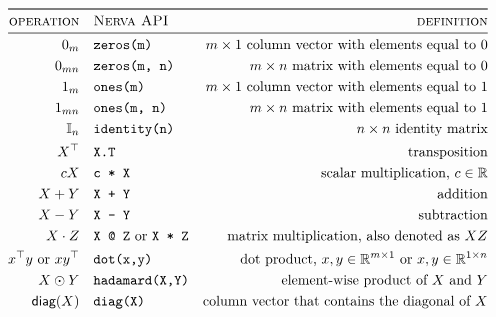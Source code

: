 \documentclass[twoside,11pt]{article}
\newcommand{\func}[1]{\ensuremath{\textsf{#1}}} %
\newcommand{\Reals}{\mathbb{R}}
\begin{document}
\begin{table}[thbp]
\centering
\caption{An overview of matrix operations that are needed for the implementation of the class of MLPs described in this paper. We assume that $X,Y \in \Reals^{m \times n}$ and $Z \in \Reals^{n \times k}$, where $k, m, n \in \mathbb{N}^{+}$. Wherever possible, we use $m$
to denote the number of rows and $n$ to denote the number of columns of a matrix or vector.
The function $\sigma$ is the sigmoid function as defined in Appendix \ref{appendix:activation-functions}.
In the second column we use the unified Nerva API notation, which is implemented consistently across the Python and C++ backends, ensuring a one-to-one correspondence between equations and code.}
\label{table:matrix-operations}
{
\small
\begin{align*}
\toprule
    \textsc{operation} &\quad \textsc{Nerva API} & \textsc{definition}
    \\
    \midrule
    0_{m} &\quad \texttt{zeros(m)} & \text{$m \times 1$ column vector with elements equal to 0}
    \\
    0_{mn} &\quad \texttt{zeros(m, n)} & \text{$m \times n$ matrix with elements equal to 0}
    \\
    1_{m} &\quad \texttt{ones(m)} & \text{$m \times 1$ column vector with elements equal to 1}
    \\
    1_{mn} &\quad \texttt{ones(m, n)} & \text{$m \times n$ matrix with elements equal to 1} 
    \\
    \mathbb{I}_n &\quad \texttt{identity(n)} & \text{$n \times n$ identity matrix} 
    \\
    X^\top &\quad \texttt{X.T} & \text{transposition}
    \\
    cX &\quad \texttt{c * X} & \text{scalar multiplication, $c \in \Reals$}
    \\
    X + Y &\quad \texttt{X + Y} & \text{addition}
    \\
    X - Y &\quad \texttt{X - Y} & \text{subtraction}
    \\
    X \cdot Z &\quad \texttt{X @ Z} \text{ or } \texttt{X * Z} 
    & \text{matrix multiplication, also denoted as $XZ$}
    \\
    x^\top y \text{ or } x y^\top &\quad \texttt{dot(x,y)} & \text{dot product, } x,y \in \Reals^{m \times 1} \text{ or } x,y \in \Reals^{1 \times n}
    \\
    X \odot Y &\quad \texttt{hadamard(X,Y)} & \text{element-wise product of $X$ and $Y$}
    \\
    \func{diag}(X) &\quad \texttt{diag(X)} & \text{column vector that contains the diagonal of $X$} 

\end{align*}}
\end{table}
\end{document}
